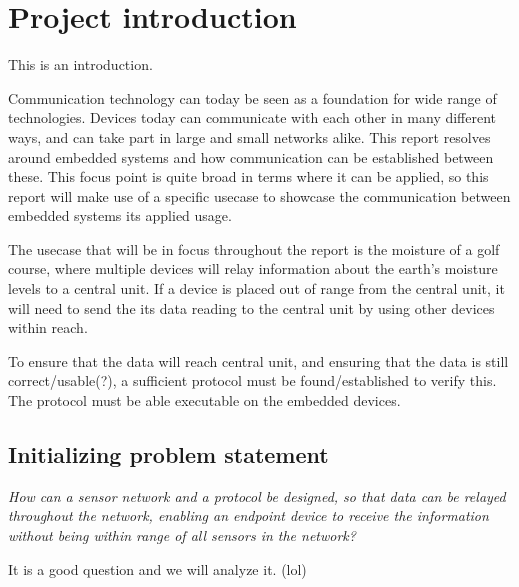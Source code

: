 \chapter{Project introduction}
This is an introduction.


Communication technology can today be seen as a foundation for wide range of technologies. Devices today can communicate with each other in many different ways, and can take part in large and small networks alike.
%
This report resolves around embedded systems and how communication can be established between these. This focus point is quite broad in terms where it can be applied, so this report will make use of a specific usecase to showcase the communication between embedded systems its applied usage.

The usecase that will be in focus throughout the report is the moisture of a golf course, where multiple devices will relay information about the earth's moisture levels to a central unit. If a device is placed out of range from the central unit, it will need to send the its data reading to the central unit by using other devices within reach.

To ensure that the data will reach central unit, and ensuring that the data is still correct/usable(?), a sufficient protocol must be found/established to verify this. The protocol must be able executable on the embedded devices.




\section{Initializing problem statement}


\textit{How can a sensor network and a protocol be designed, so that data can be relayed throughout the network, enabling an endpoint device to receive the information without being within range of all sensors in the network?}

It is a good question and we will analyze it. (lol)